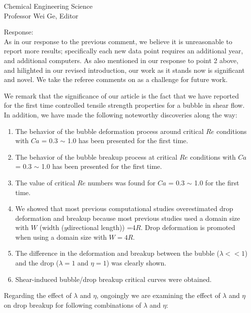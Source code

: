 \documentclass{letter}
\begin{document}
\begin{letter}{
Chemical Engineering Science\\
Professor Wei Ge, Editor\\}
\begin{enumerate}
Response: \\
As in our response to the previous comment, we believe it is unreasonable to report more results; specifically each new data point requires an additional year, and additional computers.  As also mentioned in our response to point 2 above, and hilighted in our revised introduction,
our work as it stands now is significant and novel.  We take the referee comments on as a challenge for future work.

We remark that the significance of our article is the fact that we have 
reported for the first time controlled tensile strength properties for a bubble in shear flow.  In addition, we have made the following noteworthy discoveries along the way:
\begin{enumerate}
\item The behavior of the bubble deformation process around critical $Re$ conditions with $Ca$ = 0.3  $\sim$ 1.0 has been presented for the first time.
\item The behavior of the bubble breakup process at critical $Re$ conditions with $Ca$ = 0.3  $\sim$ 1.0 has been presented for the first time.
\item The value of critical $Re$ numbers was found for $Ca$ = 0.3  $\sim$ 1.0 for the first time.
\item  We showed that most previous computational studies overestimated drop deformation and breakup because most previous studies used a domain size with $W$ (width ($y$directional length)) =4$R$. Drop deformation is promoted when using a domain size with $W=4R$. 
\item The difference in the deformation and breakup between the bubble ($\lambda<<1$) and the drop ($\lambda = 1$ and $\eta = 1$) was clearly shown.
\item Shear-induced bubble/drop breakup critical curves were obtained. 
\end{enumerate}

Regarding the effect of $\lambda$ and $\eta$, ongoingly we are examining the effect of $\lambda$ and $\eta$ on drop breakup for following 
combinations of $\lambda$ and $\eta$:


\end{enumerate}
\end{letter}
\end{document}
